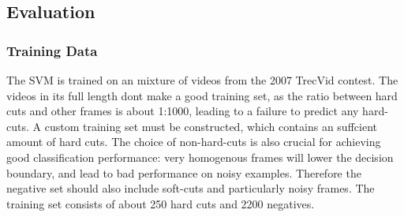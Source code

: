 \subsection{Evaluation}
\label{sec:hard_cut_evaluation}


\subsubsection{Training Data}
The SVM is trained on an mixture of videos from the 2007 TrecVid contest. The videos in its full length dont make a good training set, as the ratio between hard cuts and other frames is about 1:1000, leading to a failure to predict any hard-cuts. A custom training set must be constructed, which contains an suffcient amount of hard cuts. The choice of non-hard-cuts is also crucial for achieving good classification performance: very homogenous frames will lower the decision boundary, and lead to bad performance on noisy examples. Therefore the negative set should also include soft-cuts and particularly noisy frames. The training set consists of about 250 hard cuts and 2200 negatives.